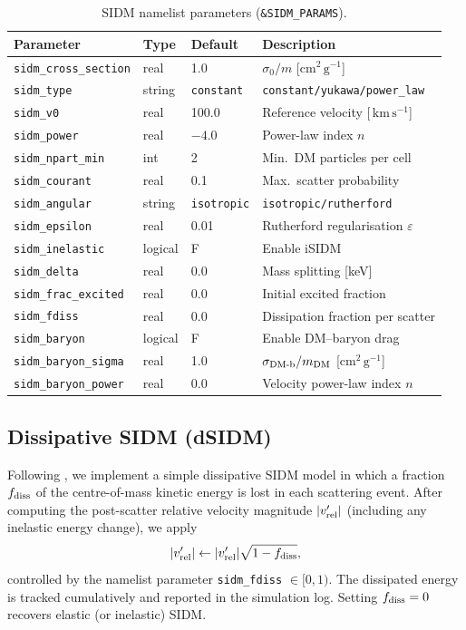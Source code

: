 \documentclass[fleqn,usenatbib]{mnras}
\newcommand{\code}[1]{\texttt{#1}}
\newcommand{\vrel}{v_{\rm rel}}
\newcommand{\kms}{\,\mathrm{km\,s^{-1}}}
\begin{document}
\begin{table}
\centering
\caption{SIDM namelist parameters (\code{\&SIDM\_PARAMS}).}
\label{tab:sidm_params}
\small
\begin{tabular}{llll}
\toprule
Parameter & Type & Default & Description \\
\midrule
\code{sidm\_cross\_section} & real & 1.0 & $\sigma_0/m$ [$\mathrm{cm^2\,g^{-1}}$] \\
\code{sidm\_type} & string & \code{constant} & \code{constant/yukawa/power\_law} \\
\code{sidm\_v0} & real & 100.0 & Reference velocity [$\kms$] \\
\code{sidm\_power} & real & $-4.0$ & Power-law index $n$ \\
\code{sidm\_npart\_min} & int & 2 & Min.\ DM particles per cell \\
\code{sidm\_courant} & real & 0.1 & Max.\ scatter probability \\
\code{sidm\_angular} & string & \code{isotropic} & \code{isotropic/rutherford} \\
\code{sidm\_epsilon} & real & 0.01 & Rutherford regularisation $\varepsilon$ \\
\code{sidm\_inelastic} & logical & F & Enable iSIDM \\
\code{sidm\_delta} & real & 0.0 & Mass splitting [keV] \\
\code{sidm\_frac\_excited} & real & 0.0 & Initial excited fraction \\
\code{sidm\_fdiss} & real & 0.0 & Dissipation fraction per scatter \\
\code{sidm\_baryon} & logical & F & Enable DM--baryon drag \\
\code{sidm\_baryon\_sigma} & real & 1.0 & $\sigma_{\rm DM\text{-}b}/m_{\rm DM}$ [$\mathrm{cm^2\,g^{-1}}$] \\
\code{sidm\_baryon\_power} & real & 0.0 & Velocity power-law index $n$ \\
\bottomrule
\end{tabular}
\end{table}


\subsection{Dissipative SIDM (dSIDM)}
\label{sec:sidm_dissipative}

Following \citet{Shen2021}, we implement a simple dissipative SIDM
model in which a fraction $f_{\rm diss}$ of the centre-of-mass kinetic
energy is lost in each scattering event.  After computing the
post-scatter relative velocity magnitude $|\vrel'|$ (including any
inelastic energy change), we apply
\begin{equation}
|\vrel'| \leftarrow |\vrel'| \sqrt{1 - f_{\rm diss}},
\end{equation}
controlled by the namelist parameter \code{sidm\_fdiss} $\in [0,1)$.
The dissipated energy is tracked cumulatively and reported in the
simulation log.  Setting $f_{\rm diss} = 0$ recovers elastic (or
inelastic) SIDM.
\end{document}
